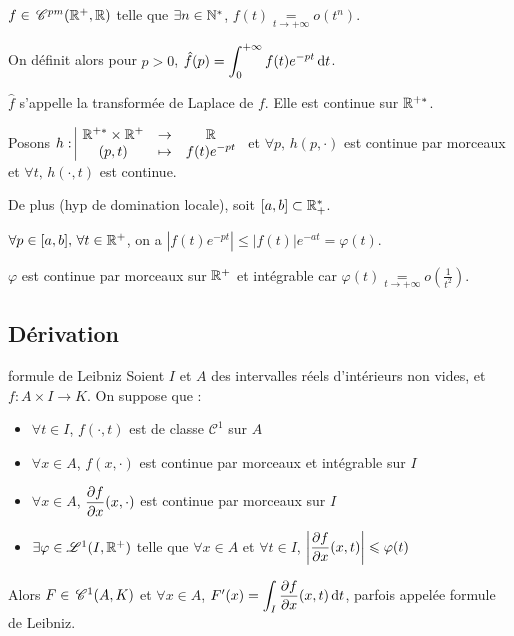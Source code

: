 \begin{exemple}
    $f \in \,\mathscr C^{pm}(\mathbb{R}^+, \mathbb{R})$ telle que $\exists n \in \mathbb{N}^*$, $f(t) \underset{t \to + \infty}{=} o(t^n)$.

    On définit alors pour $p > 0$, $\hat f(p) \displaystyle = \int_0^{+ \infty} f(t) e^{-pt} \,\mathrm{d}t$.

    $\hat f$ s'appelle la transformée de Laplace de $f$. Elle est continue sur $\mathbb{R}^{+*}$.

    Posons $h: \space \begin{array}{|ccc} \displaystyle \mathbb{R}^{+*} \times \mathbb{R}^+ & \to & \displaystyle \mathbb{R} \\ \displaystyle (p, t) & \mapsto & \displaystyle f(t) e^{-pt} \end{array}$ et 
    $\forall p, \, h(p, \cdot)$ est continue par morceaux et $\forall t, \, h(\cdot, t)$ est continue. 

    De plus (hyp de domination locale), soit $[a, b] \subset \mathbb{R}^*_+$. 

    $\forall p \in [a, b], \, \forall t \in \mathbb{R}^+$, on a $|f(t) e^{-pt}| \leqslant |f(t)|e^{-at} = \varphi(t)$. 

    $\varphi$ est continue par morceaux sur $\mathbb{R}^+$ et intégrable car 
    $\varphi(t) \underset{t \to + \infty}{=} o\left( \frac 1 {t^2} \right)$.
\end{exemple}

\subsection{Dérivation }

\begin{theoreme}{formule de Leibniz}{}
    Soient $I$ et $A$ des intervalles réels d'intérieurs non vides, et $f : A \times I \to K$. 
    On suppose que :
    \begin{itemize}
        \item $\forall t \in I$, $f(\cdot, t)$ est de classe $\mathscr C^1$ sur $A$
        \item $\forall x \in A$, $f(x, \cdot)$ est continue par morceaux et intégrable sur $I$
        \item $\forall x \in A$, $\displaystyle \frac{\partial f}{\partial x} (x, \cdot)$ est continue par morceaux sur $I$
        \item $\exists \varphi \in \mathscr L^1(I, \mathbb{R}^+)$ telle que $\forall x \in A$ et $\forall t \in I$, $\displaystyle \left|\frac{\partial f}{\partial x} (x, t) \right| \leqslant \varphi(t)$
    \end{itemize}

    Alors $F \in \,\mathscr C^{1} (A, K)$ et $\forall x \in A$, $F'(x) = \displaystyle \int_I \frac{\partial f}{\partial x} (x, t) \,\mathrm{d}t$, parfois appelée 
    formule de Leibniz.
\end{theoreme}

